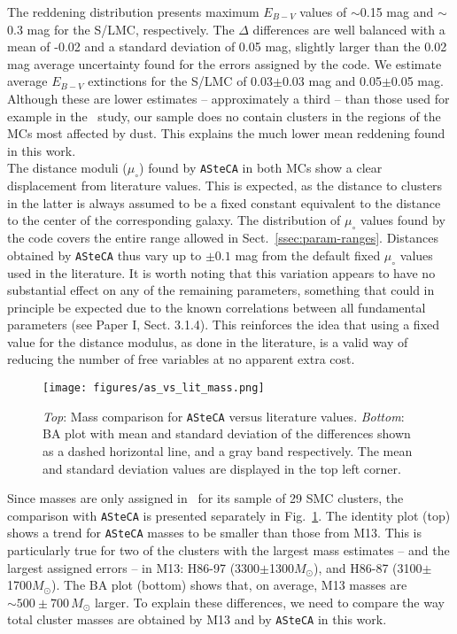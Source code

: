 \documentclass{aa}
\begin{document}
The reddening distribution presents maximum $E_{B-V}$ values of $\sim$0.15
mag and $\sim$0.3 mag for the S/LMC, respectively.
The $\Delta$ differences are well balanced with a mean of -0.02 and a
standard deviation of 0.05 mag, slightly larger than the 0.02 mag average
uncertainty found for the errors assigned by the code. We estimate average
$E_{B-V}$ extinctions for the S/LMC of 0.03$\pm$0.03 mag and 0.05$\pm$0.05 mag.
Although these are lower estimates -- approximately a third -- than those used
for example in the~\cite{Hunter_2003} study, our sample does no contain clusters
in the regions of the MCs most affected by dust. This explains the much lower
mean reddening found in this work.\\

The distance moduli ($\mu_{\circ}$) found by \texttt{ASteCA} in both MCs
show a clear displacement from literature values. This is expected, as the
distance to clusters in the latter is always assumed to be a fixed constant
equivalent to the distance to the center of the corresponding galaxy.
The distribution of $\mu_{\circ}$ values found by the code covers the entire
range allowed in Sect.~\ref{ssec:param-ranges}. Distances obtained by
\texttt{ASteCA} thus vary up to ${\pm}0.1$ mag from the default fixed
$\mu_{\circ}$ values used in the literature.
%
It is worth noting that this variation appears to have no substantial effect on
any of the remaining parameters, something that could in principle be expected
due to the known correlations between all fundamental parameters (see Paper I,
Sect. 3.1.4).
This reinforces the idea that using a fixed value for the distance modulus, as
done in the literature, is a valid way of reducing the number of free variables
at no apparent extra cost.\\

\begin{figure}
\centering
\texttt{[image: figures/as\_vs\_lit\_mass.png]}
\caption{\emph{Top}: Mass comparison for \texttt{ASteCA} versus literature
values.
\emph{Bottom}: BA plot with mean and standard deviation of the differences
shown as a dashed horizontal line, and a gray band respectively. The mean and
standard deviation values are displayed in the top left corner.}
\label{fig:as_vs_lit_mass}
\end{figure}

Since masses are only assigned in~\citet[][M13]{Maia_2013} for its sample of 29
SMC clusters, the comparison with \texttt{ASteCA} is presented separately in
Fig.~\ref{fig:as_vs_lit_mass}.
%
The identity plot (top) shows a trend for \texttt{ASteCA} masses to be smaller
than those from M13. This is particularly true for two of the clusters with
the largest mass estimates -- and the largest assigned errors -- in M13:
H86-97 (3300$\pm$1300$M_{\odot}$), and H86-87
(3100$\pm$1700$M_{\odot}$). The BA plot (bottom) shows that, on average, M13
masses are ${\sim}500{\pm}700\,M_{\odot}$ larger.
%
To explain these differences, we need to compare the way total cluster masses
are obtained by M13 and by \texttt{ASteCA} in this work.
\end{document}
